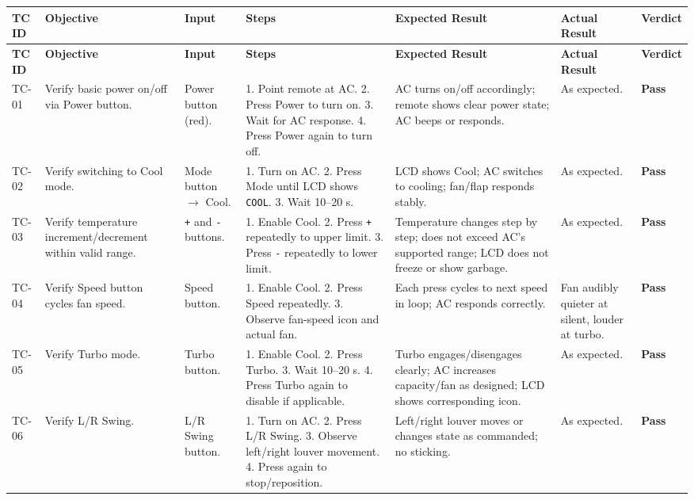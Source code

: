\documentclass[12pt, a4paper]{article}
\newcommand{\vpass}{\textcolor{PassGreen}{\textbf{Pass}}}
\begin{document}
{\small
\begin{longtable}{@{} C{1cm} L{2.5cm} L{1.8cm} L{3cm} L{2.8cm} L{1.8cm} C{1cm} @{}}
\toprule
{}
\textbf{TC ID} & \textbf{Objective} & \textbf{Input} & \textbf{Steps} & \textbf{Expected Result} & \textbf{Actual Result} & \textbf{Verdict} \\
\midrule
\endfirsthead
\toprule
{}
\textbf{TC ID} & \textbf{Objective} & \textbf{Input} & \textbf{Steps} & \textbf{Expected Result} & \textbf{Actual Result} & \textbf{Verdict} \\
\midrule
\endhead
\bottomrule
\endfoot
TC-01 & Verify basic power on/off via Power button. & Power button (red). & 1. Point remote at AC. 2. Press Power to turn on. 3. Wait for AC response. 4. Press Power again to turn off. & AC turns on/off accordingly; remote shows clear power state; AC beeps or responds. & As expected. & \vpass \\
TC-02 & Verify switching to Cool mode. & Mode button $\to$ Cool. & 1. Turn on AC. 2. Press Mode until LCD shows \texttt{COOL}. 3. Wait 10--20 s. & LCD shows Cool; AC switches to cooling; fan/flap responds stably. & As expected. & \vpass \\
TC-03 & Verify temperature increment/decrement within valid range. & \texttt{+} and \texttt{-} buttons. & 1. Enable Cool. 2. Press \texttt{+} repeatedly to upper limit. 3. Press \texttt{-} repeatedly to lower limit. & Temperature changes step by step; does not exceed AC's supported range; LCD does not freeze or show garbage. & As expected. & \vpass \\
TC-04 & Verify Speed button cycles fan speed. & Speed button. & 1. Enable Cool. 2. Press Speed repeatedly. 3. Observe fan-speed icon and actual fan. & Each press cycles to next speed in loop; AC responds correctly. & Fan audibly quieter at silent, louder at turbo. & \vpass \\
TC-05 & Verify Turbo mode. & Turbo button. & 1. Enable Cool. 2. Press Turbo. 3. Wait 10--20 s. 4. Press Turbo again to disable if applicable. & Turbo engages/disengages clearly; AC increases capacity/fan as designed; LCD shows corresponding icon. & As expected. & \vpass \\
TC-06 & Verify L/R Swing. & L/R Swing button. & 1. Turn on AC. 2. Press L/R Swing. 3. Observe left/right louver movement. 4. Press again to stop/reposition. & Left/right louver moves or changes state as commanded; no sticking. & As expected. & \vpass \\

\end{longtable}}
\end{document}
